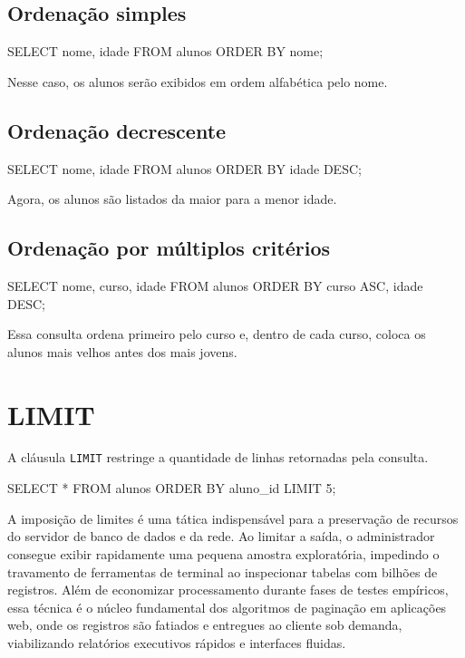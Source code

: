 \subsection{Ordenação simples}

\begin{sqlcode}
SELECT nome, idade
FROM alunos
ORDER BY nome;
\end{sqlcode}

Nesse caso, os alunos serão exibidos em ordem alfabética pelo nome.

\subsection{Ordenação decrescente}

\begin{sqlcode}
SELECT nome, idade
FROM alunos
ORDER BY idade DESC;
\end{sqlcode}

Agora, os alunos são listados da maior para a menor idade.

\subsection{Ordenação por múltiplos critérios}

\begin{sqlcode}
SELECT nome, curso, idade
FROM alunos
ORDER BY curso ASC, idade DESC;
\end{sqlcode}

Essa consulta ordena primeiro pelo curso e, dentro de cada curso, coloca os alunos mais velhos antes dos mais jovens.

\section{LIMIT}

A cláusula \texttt{LIMIT} restringe a quantidade de linhas retornadas pela consulta.

\begin{sqlcode}
SELECT *
FROM alunos
ORDER BY aluno_id
LIMIT 5;
\end{sqlcode}

A imposição de limites é uma tática indispensável para a preservação de recursos do servidor de banco de dados e da rede. Ao limitar a saída, o administrador consegue exibir rapidamente uma pequena amostra exploratória, impedindo o travamento de ferramentas de terminal ao inspecionar tabelas com bilhões de registros. Além de economizar processamento durante fases de testes empíricos, essa técnica é o núcleo fundamental dos algoritmos de paginação em aplicações web, onde os registros são fatiados e entregues ao cliente sob demanda, viabilizando relatórios executivos rápidos e interfaces fluidas.

